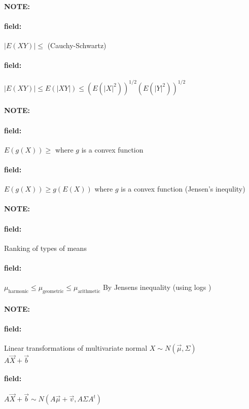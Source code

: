 \documentclass[12pt]{article}
\newenvironment{note}{\paragraph{NOTE:}}{}
\newenvironment{field}{\paragraph{field:}}{}
\begin{document}
\begin{note}
  \begin{field}
    $|E(XY)| \leq $ (Cauchy-Schwartz)
  \end{field}
  \begin{field}
    $|E(XY)| \leq E(|XY|) \leq (E(|X|^2))^{1/2}(E(|Y|^2))^{1/2}$
  \end{field}
\end{note}


\begin{note}
  \begin{field}
    $E(g(X)) \geq $ where $g$ is a convex function
  \end{field}
  \begin{field}
    $E(g(X)) \geq g(E(X))$ where $g$ is a convex function (Jensen's inequlity)
  \end{field}
\end{note}

\begin{note}
  \begin{field}
    Ranking of types of means
  \end{field}
  \begin{field}
    $\mu_{\text{harmonic}} \leq \mu_{\text{geometric}} \leq \mu_{\text{arithmetic}}$ By Jensens inequality (using logs )
  \end{field}
\end{note}

\begin{note}
  \begin{field}
    Linear transformations of multivariate normal $X \sim N(\vec{\mu},\Sigma) $\\
    $A \vec{X} + \vec{b}$
  \end{field}
  \begin{field}
    $A \vec{X} + \vec{b} \sim N(A \vec{\mu} + \vec{v}, A \Sigma A^t)$
  \end{field}
\end{note}
\end{document}
